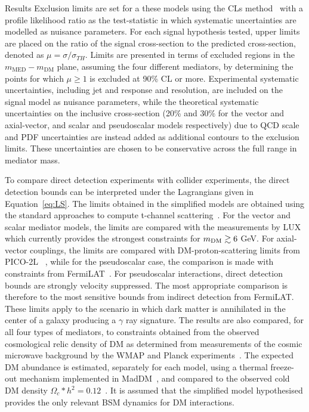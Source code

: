 \begin{section}{Results}
Exclusion limits are set for a these models using the CLs method~\cite{cls} with a profile likelihood ratio as the 
test-statistic in which systematic uncertainties are modelled as nuisance parameters. 
For each signal hypothesis tested, upper limits are placed on the ratio of 
the signal cross-section to the predicted cross-section, denoted as $\mu=\sigma/\sigma_{TH}$. Limits are presented in terms of excluded regions in the 
$m_{\mathrm{MED}}-m_{\textrm{DM}}$ plane, assuming the four different mediators, by determining the points for which $\mu\ge1$ is excluded at 90\% CL or more.
Experimental systematic uncertainties, including jet and \ETm response and resolution, are included on the signal model as nuisance parameters, while the
theoretical systematic uncertainties on the inclusive cross-section (20\% and 30\% for the vector and axial-vector, and scalar and pseudoscalar models respectively) due to QCD scale and 
PDF uncertainties are instead added as additional contours to the exclusion limits. These uncertainties are chosen to be conservative across the full range in mediator mass.

To compare direct detection experiments with collider experiments, the direct detection bounds can be interpreted under the Lagrangians given in Equation~\ref{eq:LS}. The limits obtained in 
the simplified models are obtained using the standard approaches to compute t-channel scattering~\cite{Kurylov:2003ra,Hisano:2010ct, Cheung:2013pfa,Buchmueller:2014yoa}. 
For the vector and scalar mediator models, the limits are compared with the measurements by LUX~\cite{Akerib:2012ys,Akerib:2013tjd,Szydagis:2014xog} which currently 
provides the strongest constraints for $m_{\rm{DM}} \gtrsim 6$ GeV. For axial-vector couplings, the limits are compared with 
DM-proton-scattering limits from PICO-2L~\cite{Amole:2015lsj} , while for the pseudoscalar case, 
the comparison is made with constraints from FermiLAT~\cite{Ackermann:2011wa,Abdo:2010ex}.
For pseudoscalar interactions, direct detection bounds are strongly velocity suppressed. 
The most appropriate comparison is therefore to the most sensitive bounds from indirect detection from FermiLAT. 
These limits apply to the scenario in which dark matter is annihilated in the center of a galaxy producing a $\gamma$ ray signature. 
The results are also compared, for all four types of mediators, to constraints obtained from the observed cosmological relic density of DM as determined from 
measurements of the cosmic microwave background by the WMAP and Planck experiments~\cite{Bennett:2003ba,Planck:2006aa}. The expected DM abundance is estimated, separately for each
model, using a thermal freeze-out mechanism implemented in MadDM~\cite{Backovic:2013dpa}, and compared to the observed cold DM density $\Omega_c*h^2=0.12$~\cite{Ade:2013zuv}. 
It is assumed that the simplified model hypothesised provides the only relevant BSM dynamics for DM interactions.


\end{section}
